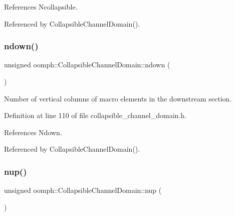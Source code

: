 References Ncollapsible.



Referenced by Collapsible\+Channel\+Domain().

\mbox{\label{classoomph_1_1CollapsibleChannelDomain_a0e1c69ac122606e4f883e96b51989d9f}} 
\subsubsection{\texorpdfstring{ndown()}{ndown()}}
{\footnotesize\ttfamily unsigned oomph\+::\+Collapsible\+Channel\+Domain\+::ndown (\begin{DoxyParamCaption}{ }\end{DoxyParamCaption})\hspace{0.3cm}{\ttfamily [inline]}}



Number of vertical columns of macro elements in the downstream section. 



Definition at line 110 of file collapsible\+\_\+channel\+\_\+domain.\+h.



References Ndown.



Referenced by Collapsible\+Channel\+Domain().

\mbox{\label{classoomph_1_1CollapsibleChannelDomain_a7e098bcffc76332af4ca220701fd32e2}} 
\subsubsection{\texorpdfstring{nup()}{nup()}}
{\footnotesize\ttfamily unsigned oomph\+::\+Collapsible\+Channel\+Domain\+::nup (\begin{DoxyParamCaption}{ }\end{DoxyParamCaption})\hspace{0.3cm}{\ttfamily [inline]}}



